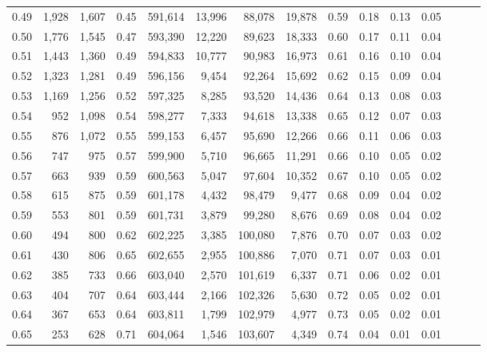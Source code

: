 \begin{tabular}{rrrrrrrrrrrrrrr}
0.49 &   1,928 &  1,607 &  0.45 &  591,614 &   13,996 &   88,078 &   19,878 &  0.59 &  0.18 &  0.13 &      0.05 \\
0.50 &   1,776 &  1,545 &  0.47 &  593,390 &   12,220 &   89,623 &   18,333 &  0.60 &  0.17 &  0.11 &      0.04 \\
0.51 &   1,443 &  1,360 &  0.49 &  594,833 &   10,777 &   90,983 &   16,973 &  0.61 &  0.16 &  0.10 &      0.04 \\
0.52 &   1,323 &  1,281 &  0.49 &  596,156 &    9,454 &   92,264 &   15,692 &  0.62 &  0.15 &  0.09 &      0.04 \\
0.53 &   1,169 &  1,256 &  0.52 &  597,325 &    8,285 &   93,520 &   14,436 &  0.64 &  0.13 &  0.08 &      0.03 \\
0.54 &     952 &  1,098 &  0.54 &  598,277 &    7,333 &   94,618 &   13,338 &  0.65 &  0.12 &  0.07 &      0.03 \\
0.55 &     876 &  1,072 &  0.55 &  599,153 &    6,457 &   95,690 &   12,266 &  0.66 &  0.11 &  0.06 &      0.03 \\
0.56 &     747 &    975 &  0.57 &  599,900 &    5,710 &   96,665 &   11,291 &  0.66 &  0.10 &  0.05 &      0.02 \\
0.57 &     663 &    939 &  0.59 &  600,563 &    5,047 &   97,604 &   10,352 &  0.67 &  0.10 &  0.05 &      0.02 \\
0.58 &     615 &    875 &  0.59 &  601,178 &    4,432 &   98,479 &    9,477 &  0.68 &  0.09 &  0.04 &      0.02 \\
0.59 &     553 &    801 &  0.59 &  601,731 &    3,879 &   99,280 &    8,676 &  0.69 &  0.08 &  0.04 &      0.02 \\
0.60 &     494 &    800 &  0.62 &  602,225 &    3,385 &  100,080 &    7,876 &  0.70 &  0.07 &  0.03 &      0.02 \\
0.61 &     430 &    806 &  0.65 &  602,655 &    2,955 &  100,886 &    7,070 &  0.71 &  0.07 &  0.03 &      0.01 \\
0.62 &     385 &    733 &  0.66 &  603,040 &    2,570 &  101,619 &    6,337 &  0.71 &  0.06 &  0.02 &      0.01 \\
0.63 &     404 &    707 &  0.64 &  603,444 &    2,166 &  102,326 &    5,630 &  0.72 &  0.05 &  0.02 &      0.01 \\
0.64 &     367 &    653 &  0.64 &  603,811 &    1,799 &  102,979 &    4,977 &  0.73 &  0.05 &  0.02 &      0.01 \\
0.65 &     253 &    628 &  0.71 &  604,064 &    1,546 &  103,607 &    4,349 &  0.74 &  0.04 &  0.01 &      0.01 \\

\end{tabular}
